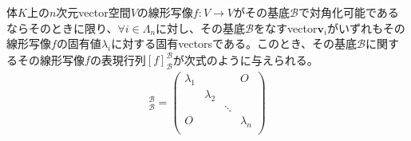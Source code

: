 \documentclass[dvipdfmx]{jsarticle}
\begin{document}
\begin{thm}\label{2.2.2.12}
体$K$上の$n$次元vector空間$V$の線形写像$f:V \rightarrow V$がその基底$\mathcal{B}$で対角化可能であるならそのときに限り、$\forall i \in \varLambda_{n}$に対し、その基底$\mathcal{B}$をなすvector$\mathbf{v}_{i}$がいずれもその線形写像$f$の固有値$\lambda_{i}$に対する固有vectorsである。このとき、その基底$\mathcal{B}$に関するその線形写像$f$の表現行列$[ f]_{\mathcal{B}}^{\mathcal{B}}$が次式のように与えられる。
\begin{align*}
[ f]_{\mathcal{B}}^{\mathcal{B}} = \begin{pmatrix}
\lambda_{1} & \  & \  & O \\
\  & \lambda_{2} & \  & \  \\
\  & \  & \ddots & \  \\
O & \  & \  & \lambda_{n} \\
\end{pmatrix}
\end{align*}
\end{thm}
\end{document}
